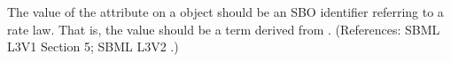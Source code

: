 The value of the attribute  on a \KineticLaw object should
be an SBO identifier referring to a rate law.  That is, the value should be
a term derived from \sboratelaw.  (References: SBML L3V1 Section 5; SBML L3V2
.)
